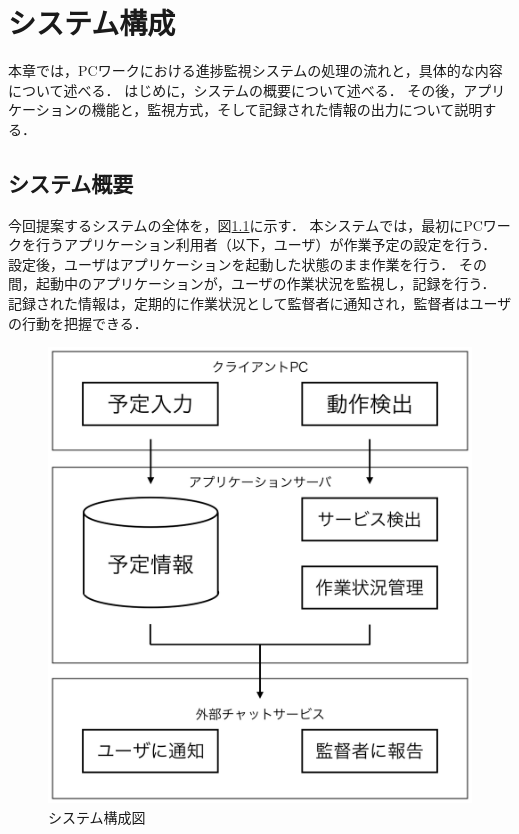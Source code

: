 \chapter{システム構成}

本章では，PCワークにおける進捗監視システムの処理の流れと，具体的な内容について述べる．
はじめに，システムの概要について述べる．
その後，アプリケーションの機能と，監視方式，そして記録された情報の出力について説明する．

\section{システム概要}
今回提案するシステムの全体を，図\ref{fig:structure_chart}に示す．
本システムでは，最初にPCワークを行うアプリケーション利用者（以下，ユーザ）が作業予定の設定を行う．
設定後，ユーザはアプリケーションを起動した状態のまま作業を行う．
その間，起動中のアプリケーションが，ユーザの作業状況を監視し，記録を行う．
記録された情報は，定期的に作業状況として監督者に通知され，監督者はユーザの行動を把握できる．

\clearpage

\begin{figure}[h]
  \begin{center}
  \includegraphics[width=12.0cm]{graphics/structure_chart.png}
  \caption{システム構成図}
  \label{fig:structure_chart}
  \end{center}
\end{figure}

